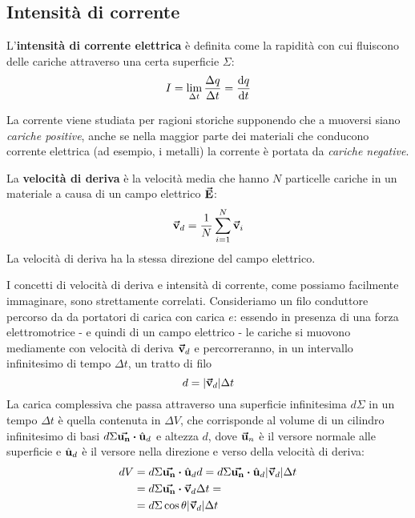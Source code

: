 \subsection{Intensità di corrente}
\begin{define}
	L'\textbf{intensità di corrente elettrica} è definita come la rapidità con cui fluiscono delle cariche attraverso una certa superficie $\Sigma$:
	\begin{equation}
		I=\lim_{\Delta t}\frac{\Delta q}{\Delta t}=\dv{q}{t}
	\end{equation}
\end{define}
\begin{attention}
	La corrente viene studiata per ragioni storiche supponendo che a muoversi siano \textit{cariche positive}, anche se nella maggior parte dei materiali che conducono corrente elettrica (ad esempio, i metalli) la corrente è portata da \textit{cariche negative}. 
\end{attention}
\begin{define}
	La \textbf{velocità di deriva} è la velocità media che hanno $N$ particelle cariche in un materiale a causa di un campo elettrico $\vb*{\va{E}}$:
	\begin{equation}
		\vb*{\va{v}}_d=\frac{1}{N}\sum_{i=1}^{N}\vb*{\va{v}}_i
	\end{equation}
	La velocità di deriva ha la stessa direzione del campo elettrico.
\end{define}
I concetti di velocità di deriva e intensità di corrente, come possiamo facilmente immaginare, sono strettamente correlati. Consideriamo un filo conduttore percorso da da portatori di carica con carica $e$: essendo in presenza di una forza elettromotrice - e quindi di un campo elettrico - le cariche si muovono mediamente con velocità di deriva $\vb*{\va{v}}_d$ e percorreranno, in un intervallo infinitesimo di tempo $\Delta t$, un tratto di filo
\begin{equation*}
	d=\abs{\vb*{\va{v}}_d}\Delta t
\end{equation*}
La carica complessiva che passa attraverso una superficie infinitesima $d\Sigma$ in un tempo $\Delta t$ è quella contenuta in $\Delta V$, che corrisponde al volume di un cilindro infinitesimo di basi $d\Sigma\vba{u_n}\vdot\vbh{u}_d$ e altezza $d$, dove $\vb*{\va{u}}_n$ è il versore normale alle superficie e $\hat{\mathbf{u}}_d$ è il versore nella direzione e verso della velocità di deriva:
\begin{align*}
	dV&=d\Sigma\vba{u_n}\vdot\vbh{u}_d d=d\Sigma\vba{u_n}\vdot\vbh{u}_d \abs{\vba{v}_d}\Delta t\\
	&=d\Sigma\vba{u_n}\vdot\vba{v}_d \Delta t =\\
	&=d\Sigma\cos\theta\abs{\vba{v}_d}\Delta t
\end{align*}
